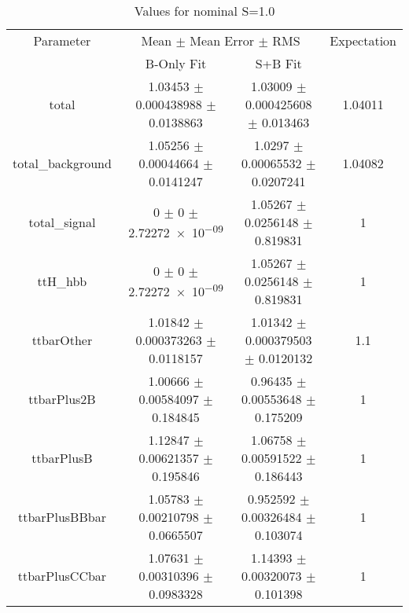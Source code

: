 \begin{table}
\centering
\caption{Values for nominal S=1.0}
\begin{tabular}{cccc}
\toprule
Parameter & \multicolumn{2}{c}{Mean $\pm$ Mean Error $\pm$ RMS} & Expectation\\
 & B-Only Fit & S+B Fit & \\
\midrule
total & \num{1.03453} $\pm$ \num{0.000438988} $\pm$ \num{0.0138863} & \num{1.03009} $\pm$ \num{0.000425608} $\pm$ \num{0.013463} & \num{1.04011}\\
total\_background & \num{1.05256} $\pm$ \num{0.00044664} $\pm$ \num{0.0141247} & \num{1.0297} $\pm$ \num{0.00065532} $\pm$ \num{0.0207241} & \num{1.04082}\\
total\_signal & \num{0} $\pm$ \num{0} $\pm$ \num{2.72272e-09} & \num{1.05267} $\pm$ \num{0.0256148} $\pm$ \num{0.819831} & \num{1}\\
ttH\_hbb & \num{0} $\pm$ \num{0} $\pm$ \num{2.72272e-09} & \num{1.05267} $\pm$ \num{0.0256148} $\pm$ \num{0.819831} & \num{1}\\
ttbarOther & \num{1.01842} $\pm$ \num{0.000373263} $\pm$ \num{0.0118157} & \num{1.01342} $\pm$ \num{0.000379503} $\pm$ \num{0.0120132} & \num{1.1}\\
ttbarPlus2B & \num{1.00666} $\pm$ \num{0.00584097} $\pm$ \num{0.184845} & \num{0.96435} $\pm$ \num{0.00553648} $\pm$ \num{0.175209} & \num{1}\\
ttbarPlusB & \num{1.12847} $\pm$ \num{0.00621357} $\pm$ \num{0.195846} & \num{1.06758} $\pm$ \num{0.00591522} $\pm$ \num{0.186443} & \num{1}\\
ttbarPlusBBbar & \num{1.05783} $\pm$ \num{0.00210798} $\pm$ \num{0.0665507} & \num{0.952592} $\pm$ \num{0.00326484} $\pm$ \num{0.103074} & \num{1}\\
ttbarPlusCCbar & \num{1.07631} $\pm$ \num{0.00310396} $\pm$ \num{0.0983328} & \num{1.14393} $\pm$ \num{0.00320073} $\pm$ \num{0.101398} & \num{1}\\
\bottomrule
\end{tabular}
\end{table}